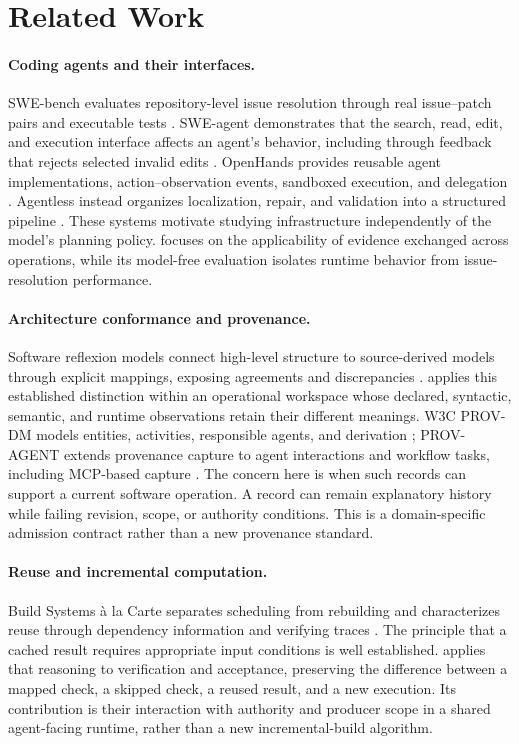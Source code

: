 \section{Related Work}
\label{sec:related}
\paragraph{Coding agents and their interfaces.}
SWE-bench evaluates repository-level issue resolution through real issue--patch pairs and executable tests \cite{jimenez2024swebench}. SWE-agent demonstrates that the search, read, edit, and execution interface affects an agent's behavior, including through feedback that rejects selected invalid edits \cite{yang2024sweagent}. OpenHands provides reusable agent implementations, action--observation events, sandboxed execution, and delegation \cite{wang2025openhands}. Agentless instead organizes localization, repair, and validation into a structured pipeline \cite{xia2025agentless}. These systems motivate studying infrastructure independently of the model's planning policy. \wcode{} focuses on the applicability of evidence exchanged across operations, while its model-free evaluation isolates runtime behavior from issue-resolution performance.

\paragraph{Architecture conformance and provenance.}
Software reflexion models connect high-level structure to source-derived models through explicit mappings, exposing agreements and discrepancies \cite{murphy1995reflexion}. \wcode{} applies this established distinction within an operational workspace whose declared, syntactic, semantic, and runtime observations retain their different meanings. W3C PROV-DM models entities, activities, responsible agents, and derivation \cite{w3c2013provdm}; PROV-AGENT extends provenance capture to agent interactions and workflow tasks, including MCP-based capture \cite{souza2025provagent}. The concern here is when such records can support a current software operation. A record can remain explanatory history while failing revision, scope, or authority conditions. This is a domain-specific admission contract rather than a new provenance standard.

\paragraph{Reuse and incremental computation.}
Build Systems \`a la Carte separates scheduling from rebuilding and characterizes reuse through dependency information and verifying traces \cite{mokhov2018buildsystems}. The principle that a cached result requires appropriate input conditions is well established. \wcode{} applies that reasoning to verification and acceptance, preserving the difference between a mapped check, a skipped check, a reused result, and a new execution. Its contribution is their interaction with authority and producer scope in a shared agent-facing runtime, rather than a new incremental-build algorithm.

